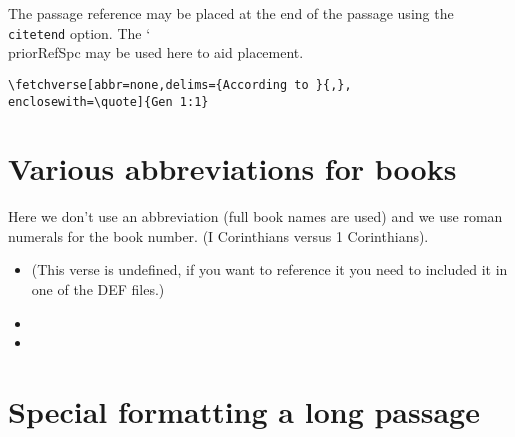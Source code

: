 \documentclass{article}
\def\cs#1{{\ttfamily\char`\\#1}}
\begin{document}
\medskip\noindent
The passage reference may be placed at the end of the passage using the \texttt{citetend}
option. The \cs{priorRefSpc} may be used here to aid placement.
\begin{quote}
\priorRefSpc{\fbFillRght}\afterBookSpc{\ }

\priorRefSpc{\fbFitItIn}\afterBookSpc{\nobreak\ }
\end{quote}

\noindent
\verb|\fetchverse[abbr=none,delims={According to }{,},|\\\null
\qquad\verb|enclosewith=\quote]{Gen 1:1}|\\[3pt]

\section{Various abbreviations for books}


Here we don't use an abbreviation (full book names are used) and we use
roman numerals for the book number. (I Corinthians versus 1 Corinthians).

\medskip\noindent
{}



\medskip\noindent
{}

\begin{itemize}
\item{} (This verse is undefined, if you want to
    reference it you need to included it in one of the \textsf{DEF} files.)

\item {}

\item {}
\end{itemize}

\section{Special formatting a long passage}

\newlength\verseBoxLength
\settowidth{\verseBoxLength}{\normalsize\normalfont0000}
\renewcommand{\verseFmt}[1]{\par\noindent\makebox[\verseBoxLength][c]{#1}}
\afterRef{\par\kern3pt}
\end{document}
